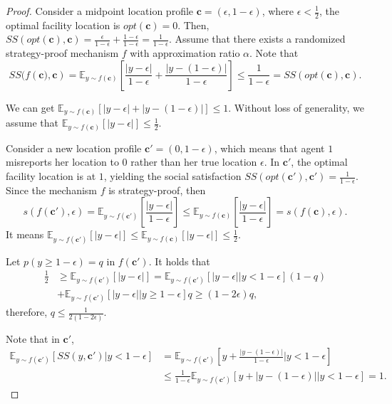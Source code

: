 \documentclass[runningheads]{11llncst}
\begin{document}
\begin{proof}
    Consider a midpoint location profile $\textbf{c}=(\epsilon,1-\epsilon)$, where $\epsilon<\frac{1}{2}$, the optimal facility location is $opt(\textbf{c})=0$. Then, $SS(opt(\textbf{c}),\textbf{c})=\frac{\epsilon}{1-\epsilon}+\frac{1-\epsilon}{1-\epsilon}=\frac{1}{1-\epsilon}$. Assume that there exists a  randomized  strategy-proof mechanism  $f$ with approximation ratio $\alpha$. Note that $$SS(f(\textbf{c)},\textbf{c})=\mathbb{E}_{y\sim f(\textbf{c})}\left[\frac{|y-\epsilon|}{1-\epsilon}+\frac{|y-(1-\epsilon)|}{1-\epsilon}\right]\leq \frac{1}{1-\epsilon}=SS(opt(\textbf{c}),\textbf{c}).$$
		
		We can get $\mathbb{E}_{y\sim f(\textbf{c})}[|y-\epsilon|+|y-(1-\epsilon)|]\leq 1$. Without loss of generality, we assume that $\mathbb{E}_{y\sim f(\textbf{c})}[|y-\epsilon|]\leq \frac{1}{2}$.
		
		Consider a new location profile $\textbf{c}'=(0,1-\epsilon)$, which means that agent $1$ misreports her location to $0$ rather than her true location $\epsilon$. In $\textbf{c}'$, the optimal facility location is at $1$, yielding the social satisfaction $SS(opt(\textbf{c}'),\textbf{c}')=\frac{1}{1-\epsilon}$. Since the mechanism $f$ is strategy-proof, then 
		\begin{equation*}
			s(f(\textbf{c}'),\epsilon)=\mathbb{E}_{y\sim f(\textbf{c}')}\left[\frac{|y-\epsilon|}{1-\epsilon}\right]\leq \mathbb{E}_{y\sim f(\textbf{c})}\left[\frac{|y-\epsilon|}{1-\epsilon}\right]=s(f(\textbf{c}),\epsilon).
		\end{equation*}
		It means $\mathbb{E}_{y\sim f(\textbf{c}')}[|y-\epsilon|]\leq \mathbb{E}_{y\sim f(\textbf{c})}[|y-\epsilon|]\leq \frac{1}{2}$.
		
		Let $p(y\geq 1-\epsilon)=q$ in $f(\textbf{c}')$. It holds that 
		\begin{equation*}
			\begin{aligned}
				\frac{1}{2} &\geq \mathbb{E}_{y\sim f(\textbf{c}')}[|y-\epsilon|]=\mathbb{E}_{y\sim f(\textbf{c}')}[|y-\epsilon|| y<1-\epsilon](1-q)\\
				&+\mathbb{E}_{y\sim f(\textbf{c}')}[|y-\epsilon|| y\geq 1-\epsilon]q\geq (1-2 \epsilon)q,
			\end{aligned}
		\end{equation*}
	 therefore, $q\leq \frac{1}{2(1-2\epsilon)}$.
		
		 
		Note that in $\textbf{c}'$, 
		\begin{equation*}
			\begin{aligned}
				\mathbb{E}_{y\sim f(\textbf{c}')}\left[SS(y,\textbf{c}')| y<1-\epsilon\right]&=\mathbb{E}_{y\sim f(\textbf{c}')}\left[y+\frac{|y-(1-\epsilon)|}{1-\epsilon}\bigg| y<1-\epsilon\right]\\
				&\leq \frac{1}{1-\epsilon}\mathbb{E}_{y\sim f(\textbf{c}')}\left[y+|y-(1-\epsilon)|| y<1-\epsilon\right]=1.
			\end{aligned}
		\end{equation*}
		

\end{proof}
\end{document}
